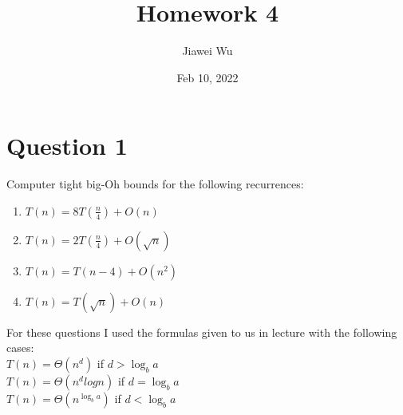 \documentclass[
	12pt
]{fphw}
\title{Homework 4} %
\author{Jiawei Wu} %
\date{Feb 10, 2022} %
\institute{Rensselaer Polytechnic Institute} %
\begin{document}
\maketitle %


\section*{Question 1}

\begin{problem}
	Computer tight big-Oh bounds for the following recurrences:

	\medskip

	\begin{enumerate}
		\item $T(n) = 8T(\frac{n}{4}) + O(n)$
		\item $T(n) = 2T(\frac{n}{4}) + O(\sqrt{n})$
		\item $T(n) = T(n - 4) + O(n^2)$
		\item $T(n) = T(\sqrt{n}) + O(n)$
	\end{enumerate}
\end{problem}
\begin{center}
    For these questions I used the formulas given to us in lecture
	with the following cases: \\
	$T(n) = \Theta(n^d)$ if $d > \log_b a$\\
	$T(n) = \Theta(n^dlogn)$ if $d = \log_b a$\\
	$T(n) = \Theta(n^{\log_b a})$ if $d < \log_b a$
\end{center}

\end{document}
